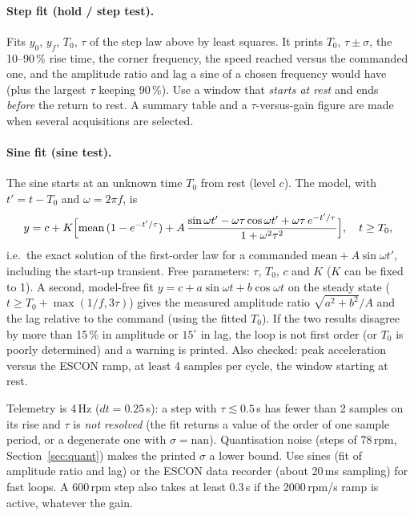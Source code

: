 \documentclass[a4paper,11pt]{article}
\begin{document}
\paragraph{Step fit (hold / step test).} Fits $y_0$, $y_f$, $T_0$, $\tau$ of the step law above by least squares. It prints $T_0$, $\tau\pm\sigma$, the 10--90\,\% rise time, the corner frequency, the speed reached versus the commanded one, and the amplitude ratio and lag a sine of a chosen frequency would have (plus the largest $\tau$ keeping 90\,\%). Use a window that \emph{starts at rest} and ends \emph{before} the return to rest. A summary table and a $\tau$-versus-gain figure are made when several acquisitions are selected.

\paragraph{Sine fit (sine test).} The sine starts at an unknown time $T_0$ from rest (level $c$). The model, with $t'=t-T_0$ and $\omega=2\pi f$, is
\[
  y=c+K\Bigl[\text{mean}\,(1-e^{-t'/\tau})+A\,\frac{\sin\omega t'-\omega\tau\cos\omega t'+\omega\tau\,e^{-t'/\tau}}{1+\omega^2\tau^2}\Bigr],\quad t\ge T_0 ,
\]
i.e.\ the exact solution of the first-order law for a commanded $\text{mean}+A\sin\omega t'$, including the start-up transient. Free parameters: $\tau$, $T_0$, $c$ and $K$ ($K$ can be fixed to 1). A second, model-free fit $y=c+a\sin\omega t+b\cos\omega t$ on the steady state ($t\ge T_0+\max(1/f,3\tau)$) gives the measured amplitude ratio $\sqrt{a^2+b^2}/A$ and the lag relative to the command (using the fitted $T_0$). If the two results disagree by more than 15\,\% in amplitude or $15^\circ$ in lag, the loop is not first order (or $T_0$ is poorly determined) and a warning is printed. Also checked: peak acceleration versus the ESCON ramp, at least 4 samples per cycle, the window starting at rest.

\begin{warnbox}
Telemetry is 4\,Hz ($dt=0.25$\,s): a step with $\tau\lesssim0.5$\,s has fewer than 2 samples on its rise and $\tau$ is \emph{not resolved} (the fit returns a value of the order of one sample period, or a degenerate one with $\sigma=\text{nan}$). Quantisation noise (steps of 78\,rpm, Section~\ref{sec:quant}) makes the printed $\sigma$ a lower bound. Use sines (fit of amplitude ratio and lag) or the ESCON data recorder (about 20\,ms sampling) for fast loops. A 600\,rpm step also takes at least 0.3\,s if the 2000\,rpm/s ramp is active, whatever the gain.
\end{warnbox}
\end{document}

